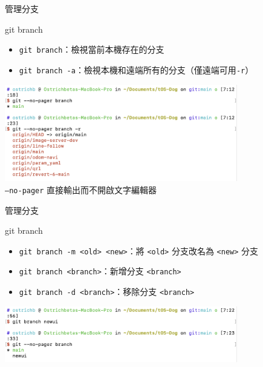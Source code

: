 \documentclass[xetex, unicode, 10pt, aspectratio=169]{beamer}
\begin{document}
\begin{frame}{管理分支}
    \begin{block}{git branch}
        \begin{itemize}
            \item \texttt{git branch}：檢視當前本機存在的分支
            \item \texttt{git branch -a}：檢視本機和遠端所有的分支（僅遠端可用\texttt{-r}）
        \end{itemize}

        \begin{center}
            \includegraphics[width=4in]{./img/git-branch.png}\\
            \texttt{--no-pager} 直接輸出而不開啟文字編輯器
        \end{center}
    \end{block}

\end{frame}

\begin{frame}{管理分支}
    \begin{block}{git branch}
        \begin{itemize}
            \item \texttt{git branch -m <old> <new>}：將 \texttt{<old>}
                分支改名為 \texttt{<new>} 分支
            \item \texttt{git branch <branch>}：新增分支 \texttt{<branch>}
            \item \texttt{git branch -d <branch>}：移除分支 \texttt{<branch>}
        \end{itemize}

        \begin{center}
            \includegraphics[width=4in]{./img/git-branch-create.png}
        \end{center}
    \end{block}
\end{frame}
\end{document}
